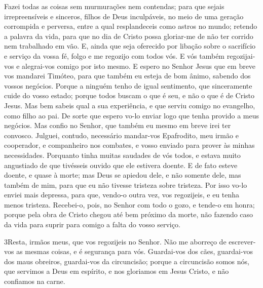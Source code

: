 Fazei todas as coisas sem murmurações nem contendas; para
que sejais irrepreensíveis e sinceros, filhos de Deus inculpáveis,
no meio de uma geração corrompida e perversa, entre a qual
resplandeceis como astros no mundo; retendo a palavra da
vida, para que no dia de Cristo possa gloriar-me de não ter corrido
nem trabalhado em vão. E, ainda que seja oferecido por
libação sobre o sacrifício e serviço da vossa fé, folgo e me
regozijo com todos vós. E vós também regozijai-vos e
alegrai-vos comigo por isto mesmo. E espero no Senhor Jesus
que em breve vos mandarei Timóteo, para que também eu esteja de bom
ânimo, sabendo dos vossos negócios. Porque a ninguém tenho de
igual sentimento, que sinceramente cuide do vosso estado;
porque todos buscam o que é seu, e não o que é de Cristo
Jesus. Mas bem sabeis qual a sua experiência, e que serviu
comigo no evangelho, como filho ao pai. De sorte que espero
vo-lo enviar logo que tenha provido a meus negócios. Mas
confio no Senhor, que também eu mesmo em breve irei ter convosco.
Julguei, contudo, necessário mandar-vos Epafrodito, meu irmão
e cooperador, e companheiro nos combates, e vosso enviado para
prover às minhas necessidades. Porquanto tinha muitas
saudades de vós todos, e estava muito angustiado de que tivésseis
ouvido que ele estivera doente. E de fato esteve doente, e
quase à morte; mas Deus se apiedou dele, e não somente dele, mas
também de mim, para que eu não tivesse tristeza sobre tristeza.
Por isso vo-lo enviei mais depressa, para que, vendo-o outra
vez, vos regozijeis, e eu tenha menos tristeza. Recebei-o,
pois, no Senhor com todo o gozo, e tende-o em honra; porque
pela obra de Cristo chegou até bem próximo da morte, não fazendo
caso da vida para suprir para comigo a falta do vosso serviço.

\medskip

\lettrine{3} Resta, irmãos meus, que vos regozijeis no Senhor.
Não me aborreço de escrever-vos as mesmas coisas, e é segurança para
vós. Guardai-vos dos cães, guardai-vos dos maus obreiros,
guardai-vos da circuncisão; porque a circuncisão somos nós, que
servimos a Deus em espírito, e nos gloriamos em Jesus Cristo, e não
confiamos na carne.

